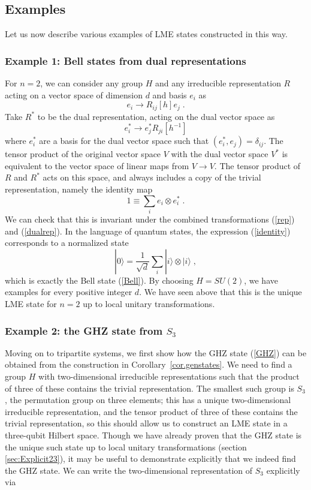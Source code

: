 \documentclass[12pt]{article}
\theoremstyle{definition}
\newcommand{\be}{\begin{equation}}
\newcommand{\ee}{\end{equation}}
\begin{document}
\subsection{Examples}

Let us now describe various examples of LME states constructed in this way.

\subsubsection*{Example 1:  Bell states from dual representations}

For $n=2$, we can consider any group $H$ and any irreducible representation $R$ acting on a vector space of dimension $d$ and basis $e_i$ as
\be
\label{rep}
e_i \to R_{ij}[h] e_j \; .
\ee
Take $R^*$ to be the dual representation, acting on the dual vector space as
\be
\label{dualrep}
e^*_i \to  e^*_j R_{ji}[h^{-1}]
\ee
where $e^*_i$ are a basis for the dual vector space such that $(e^*_i, e_j) = \delta_{ij}$. The tensor product of the original vector space $V$ with the dual vector space $V^*$ is equivalent to the vector space of linear maps from $V \to V$. The tensor product of $R$ and $R^*$ acts on this space, and always includes a copy of the trivial representation, namely the identity map
\be
\label{identity}
1 \equiv \sum_i e_i  \otimes e_i^* \; .
\ee
We can check that this is invariant under the combined transformations (\ref{rep}) and (\ref{dualrep}). In the language of quantum states, the expression (\ref{identity}) corresponds to a normalized state
\be
|0 \rangle = \frac{1}{\sqrt{d}} \sum_i |i \rangle  \otimes |i \rangle \; ,
\ee
which is exactly the Bell state (\ref{Bell}). By choosing $H = SU(2)$, we have examples for every positive integer $d$. We have seen above that this is the unique LME state for $n=2$ up to local unitary transformations.

\subsubsection*{Example 2: the GHZ state from $S_3$}

Moving on to tripartite systems, we first show how the GHZ state
(\ref{GHZ}) can be obtained from the construction in Corollary~\ref{cor.genstates}. We
need to find a group $H$ with two-dimensional irreducible
representations such that the product of three of these contains the
trivial representation. The smallest such group is $S_3$, the
permutation group on three elements; this has a unique two-dimensional
irreducible representation, and the tensor product of three of these
contains the trivial representation, so this should allow us to
construct an LME state in a three-qubit Hilbert space. Though we have
already proven that the GHZ state is the unique such state up to local
unitary transformations (section \ref{sec:Explicit23}), it may be
useful to demonstrate explicitly that we indeed find the GHZ state. We
can write the two-dimensional representation of $S_3$ explicitly via
\end{document}
